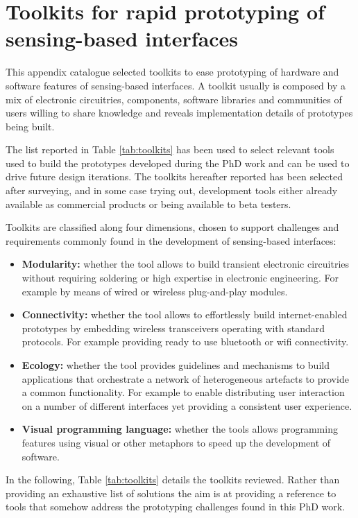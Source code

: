 \chapter{Toolkits for rapid prototyping of sensing-based interfaces} \label{toolkits}

This appendix catalogue selected toolkits to ease prototyping of hardware and software features of sensing-based interfaces. A toolkit usually is composed by a mix of electronic circuitries, components, software libraries and communities of users willing to share knowledge and reveals implementation details of prototypes being built. 

The list reported in Table \ref{tab:toolkits} has been used to select relevant tools used to build the prototypes developed during the PhD work and can be used to drive future design iterations.  The toolkits hereafter reported has been selected after surveying, and in some case trying out, development tools either already available as commercial products or being available to beta testers. 

Toolkits are classified along four dimensions, chosen to support  challenges and requirements commonly found in the development of sensing-based interfaces:

\begin{itemize}
	\item \textbf{Modularity: }whether the tool allows to build transient electronic circuitries without requiring soldering or high expertise in electronic engineering. For example by means of wired or wireless plug-and-play modules. 
	\item \textbf{Connectivity: }whether the tool allows to effortlessly build internet-enabled prototypes by embedding wireless transceivers operating with standard protocols. For example providing ready to use bluetooth or wifi connectivity.
	\item \textbf{Ecology: }whether the tool provides guidelines and mechanisms to build applications that orchestrate a network of heterogeneous artefacts to provide a common functionality. For example to enable distributing user interaction on a number of different interfaces yet providing a consistent user experience.
	\item \textbf{Visual programming language: }whether the tools allows programming features using visual or other metaphors to speed up the development of software.
\end{itemize} 

In the following, Table \ref{tab:toolkits} details the toolkits reviewed. Rather than providing an exhaustive list of solutions the aim is at providing a reference to tools that somehow address the prototyping challenges found in this PhD work. 


